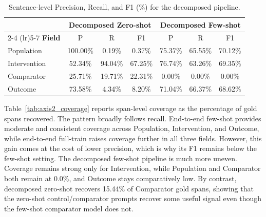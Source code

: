 \documentclass{article}
\begin{document}
\begin{table}[h]
\centering
\caption{Sentence-level Precision, Recall, and F1 (\%) for the decomposed pipeline.}
\label{tab:axis2_sentence_results}
\begin{tabular}{lcccccc}
\toprule
& \multicolumn{3}{c}{\textbf{Decomposed Zero-shot}} & \multicolumn{3}{c}{\textbf{Decomposed Few-shot}} \\
\cmidrule(lr){2-4} \cmidrule(lr){5-7}
\textbf{Field} & P & R & F1 & P & R & F1 \\
\midrule
Population   & 100.00\% & 0.19\% & 0.37\% & 75.37\% & 65.55\% & 70.12\% \\
Intervention & 52.34\% & 94.04\% & 67.25\% & 76.74\% & 63.26\% & 69.35\% \\
Comparator   & 25.71\% & 19.71\% & 22.31\% & 0.00\% & 0.00\% & 0.00\% \\
Outcome      & 73.58\% & 4.34\% & 8.20\% & 71.04\% & 66.37\% & 68.62\% \\
\bottomrule
\end{tabular}
\end{table}

Table~\ref{tab:axis2_coverage} reports span-level coverage as the percentage of gold spans recovered. The pattern broadly follows recall. End-to-end few-shot provides moderate and consistent coverage across Population, Intervention, and Outcome, while end-to-end full-train raises coverage further in all three fields. However, this gain comes at the cost of lower precision, which is why its F1 remains below the few-shot setting. The decomposed few-shot pipeline is much more uneven. Coverage remains strong only for Intervention, while Population and Comparator both remain at 0.0\%, and Outcome stays comparatively low. By contrast, decomposed zero-shot recovers 15.44\% of Comparator gold spans, showing that the zero-shot control/comparator prompts recover some useful signal even though the few-shot comparator model does not.

\begin{table}[h]
\centering
\caption{Span-level coverage for Axis 2 methods across PICO fields.}
\label{tab:axis2_coverage}
\end{table}
\end{document}
